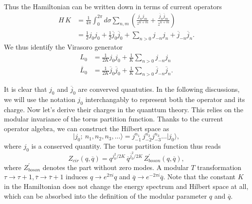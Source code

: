 Thus the Hamiltonian can be written down in terms of current operators
\begin{equation}
	\begin{aligned}
		H\,K &= \frac{1}{4\pi} \int_0^{2\pi} d\sigma \sum_{n,m} \left( \frac{j_n j_m}{z^{n+m}} + \frac{\overline{j}_n \overline{j}_m}{{\overline{z}}^{n+m}} \right) \\
		&= \frac{1}{2} j_0 j_0 + \frac{1}{2} \overline{j}_{0} \overline{j}_0 + \sum_{n>0} j_{-n} j_n + \overline{j}_{-n} \overline{j}_n.
	\end{aligned}
\end{equation}
We thus identify the Virasoro generator
\begin{equation}
	\begin{aligned}
		L_0 &= \frac{1}{2K} j_0 j_0 + \frac{1}{K}\sum_{n>0} j_{-n} j_n \\
		\overline{L}_0 &= \frac{1}{2K} \overline{j}_{0} \overline{j}_0 + \frac{1}{K}\sum_{n>0} \overline{j}_{-n} \overline{j}_n.
	\end{aligned}
\end{equation}

It is clear that $j_0$ and $\overline{j}_0$ are converved quantuties. In the following discussions, we will use the notation $j_0$ interchangably to represent both the operator and its charge. Now let's derive their charges in the quanttum theory. This relies on the modular invariance of the torus partition function. Thanks to the current operator algebra, we can construct the Hilbert space as
\begin{equation}
	\vert j_0;\ n_1, n_2,n_3,\dots \rangle = j_{-1}^{n_1}\,j_{-2}^{n_2} j_{-3}^{n_3} \dots \vert j_0\rangle, 
\end{equation}
where $j_0$ is a conserved quantity. The torus partition function thus reads
\begin{equation}
	Z_{cir}(q,\overline{q}) = q^{j_0^2/2K} \, \overline{q}^{\overline{j}_0^2/2K} \, Z^{\prime}_{boson} (q,\overline{q}),
\end{equation}
where $Z^\prime_{boson}$ denotes the part without zero modes. A modular $T$ transformation $\tau \rightarrow \tau + 1, \overline{\tau} \rightarrow \overline{\tau} + 1$ induces $q \rightarrow e^{2\pi i}q$ and $\overline{q} \rightarrow e^{-2\pi i}\overline{q}$. Note that the constant $K$ in the Hamiltonian does not change the energy spectrum and Hilbert space at all, which can be absorbed into the definition of the modular parameter $q$ and $\overline{q}$. 

